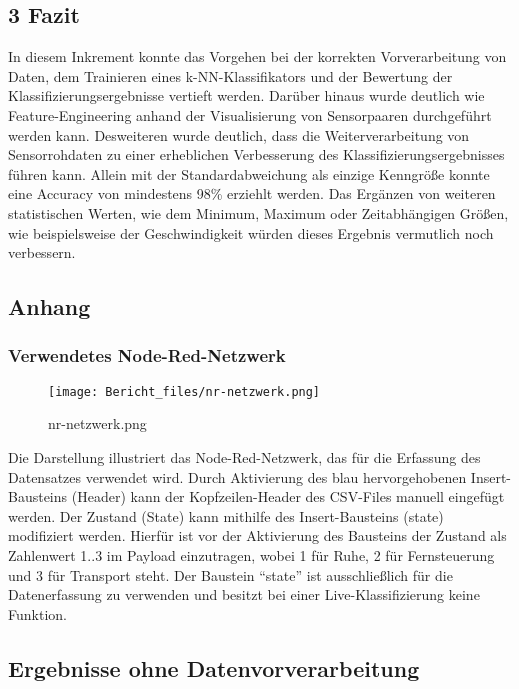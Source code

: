 \documentclass[11pt]{article}
\begin{document}
    \hypertarget{fazit}{%
\subsection*{3 Fazit}\label{fazit}}

    In diesem Inkrement konnte das Vorgehen bei der korrekten
Vorverarbeitung von Daten, dem Trainieren eines k-NN-Klassifikators und
der Bewertung der Klassifizierungsergebnisse vertieft werden. Darüber
hinaus wurde deutlich wie Feature-Engineering anhand der Visualisierung
von Sensorpaaren durchgeführt werden kann. Desweiteren wurde deutlich,
dass die Weiterverarbeitung von Sensorrohdaten zu einer erheblichen
Verbesserung des Klassifizierungsergebnisses führen kann. Allein mit der
Standardabweichung als einzige Kenngröße konnte eine Accuracy von
mindestens 98\% erziehlt werden. Das Ergänzen von weiteren statistischen
Werten, wie dem Minimum, Maximum oder Zeitabhängigen Größen, wie
beispielsweise der Geschwindigkeit würden dieses Ergebnis vermutlich
noch verbessern.

    \hypertarget{anhang}{%
\subsection*{Anhang}\label{anhang}}

    \hypertarget{verwendetes-node-red-netzwerk}{%
\subsubsection*{Verwendetes
Node-Red-Netzwerk}\label{verwendetes-node-red-netzwerk}}

    \begin{figure}
\centering
\texttt{[image: Bericht\_files/nr-netzwerk.png]}
\caption{nr-netzwerk.png}
\end{figure}

    Die Darstellung illustriert das Node-Red-Netzwerk, das für die Erfassung
des Datensatzes verwendet wird. Durch Aktivierung des blau
hervorgehobenen Insert-Bausteins (Header) kann der Kopfzeilen-Header des
CSV-Files manuell eingefügt werden. Der Zustand (State) kann mithilfe
des Insert-Bausteins (state) modifiziert werden. Hierfür ist vor der
Aktivierung des Bausteins der Zustand als Zahlenwert 1..3 im Payload
einzutragen, wobei 1 für Ruhe, 2 für Fernsteuerung und 3 für Transport
steht. Der Baustein ``state'' ist ausschließlich für die Datenerfassung
zu verwenden und besitzt bei einer Live-Klassifizierung keine Funktion.

    \hypertarget{ergebnisse-ohne-datenvorverarbeitung}{%
\subsection*{Ergebnisse ohne
Datenvorverarbeitung}\label{ergebnisse-ohne-datenvorverarbeitung}}
\end{document}
